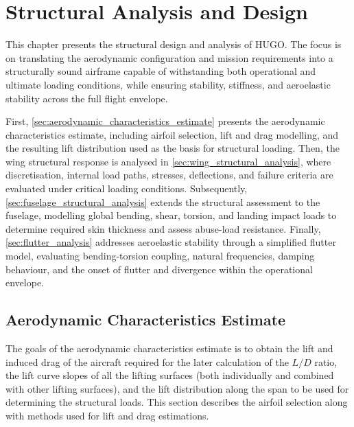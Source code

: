 \chapter{Structural Analysis and Design}
\label{ch:structural_characteristics}



This chapter presents the structural design and analysis of HUGO. The focus is on translating the aerodynamic configuration and mission requirements into a structurally sound airframe capable of withstanding both operational and ultimate loading conditions, while ensuring stability, stiffness, and aeroelastic stability across the full flight envelope.

First, \autoref{sec:aerodynamic_characteristics_estimate} presents the aerodynamic characteristics estimate, including airfoil selection, lift and drag modelling, and the resulting lift distribution used as the basis for structural loading. Then, the wing structural response is analysed in \autoref{sec:wing_structural_analysis}, where discretisation, internal load paths, stresses, deflections, and failure criteria are evaluated under critical loading conditions. Subsequently, \autoref{sec:fuselage_structural_analysis} extends the structural assessment to the fuselage, modelling global bending, shear, torsion, and landing impact loads to determine required skin thickness and assess abuse-load resistance. Finally, \autoref{sec:flutter_analysis} addresses aeroelastic stability through a simplified flutter model, evaluating bending-torsion coupling, natural frequencies, damping behaviour, and the onset of flutter and divergence within the operational envelope.


\section{Aerodynamic Characteristics Estimate}
\label{sec:aerodynamic_characteristics_estimate}
The goals of the aerodynamic characteristics estimate is to obtain the lift and induced drag of the aircraft required for the later calculation of the $L/D$ ratio, the lift curve slopes of all the lifting surfaces (both individually and combined with other lifting surfaces), and the lift distribution along the span to be used for determining the structural loads. This section describes the airfoil selection along with methods used for lift and drag estimations.
